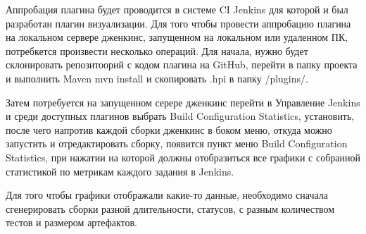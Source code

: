  Аппробация плагина будет проводится в системе CI Jenkins для которой и был разработан плагин визуализации. Для того чтобы провести аппробацию плагина на локальном сервере дженкинс, запущенном на локальном или удаленном ПК, потребкется произвести несколько операций. Для начала, нужно будет склонировать репозитоорий с кодом плагина на GitHub, перейти в папку проекта и выполнить \cite{deployplugin} Maven mvn install и скопировать .hpi в папку /plugins/. 
 
 Затем потребуется на запущенном серере дженкинс перейти в Управление Jenkins  и среди доступных плагинов выбрать Build Configuration Statistics, установить, после чего напротив каждой сборки дженкинс в боком меню, откуда можно запустить и отредактировать сборку, появится пункт меню Build Configuration Statistics, при нажатии на которой должны отобразиться все графики с собранной статистикой по метрикам каждого задания в Jenkins. 
 
 Для того чтобы графики отображали какие-то данные, необходимо сначала сгенерировать сборки разной длительности, статусов, с разным количеством тестов и размером артефактов.






%
%

%
%







